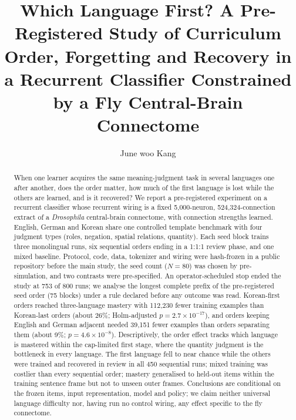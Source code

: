 \documentclass[preprint,12pt,authoryear]{elsarticle}
\begin{document}
\begin{frontmatter}

\title{Which Language First? A Pre-Registered Study of Curriculum Order, Forgetting and Recovery in a Recurrent Classifier Constrained by a Fly Central-Brain Connectome}

\author[a]{June woo Kang}
\ead{[email]}

\begin{abstract}
When one learner acquires the same meaning-judgment task in several languages one after another, does the order matter, how much of the first language is lost while the others are learned, and is it recovered? We report a pre-registered experiment on a recurrent classifier whose recurrent wiring is a fixed 5{,}000-neuron, 524{,}324-connection extract of a \emph{Drosophila} central-brain connectome, with connection strengths learned. English, German and Korean share one controlled template benchmark with four judgment types (roles, negation, spatial relations, quantity). Each seed block trains three monolingual runs, six sequential orders ending in a 1:1:1 review phase, and one mixed baseline. Protocol, code, data, tokenizer and wiring were hash-frozen in a public repository before the main study, the seed count ($N{=}80$) was chosen by pre-simulation, and two contrasts were pre-specified. An operator-scheduled stop ended the study at 753 of 800 runs; we analyse the longest complete prefix of the pre-registered seed order (75 blocks) under a rule declared before any outcome was read. Korean-first orders reached three-language mastery with 112{,}230 fewer training examples than Korean-last orders (about 26\%; Holm-adjusted $p{=}2.7{\times}10^{-17}$), and orders keeping English and German adjacent needed 39{,}151 fewer examples than orders separating them (about 9\%; $p{=}4.6{\times}10^{-8}$). Descriptively, the order effect tracks which language is mastered within the cap-limited first stage, where the quantity judgment is the bottleneck in every language. The first language fell to near chance while the others were trained and recovered in review in all 450 sequential runs; mixed training was costlier than every sequential order; mastery generalised to held-out items within the training sentence frame but not to unseen outer frames. Conclusions are conditional on the frozen items, input representation, model and policy; we claim neither universal language difficulty nor, having run no control wiring, any effect specific to the fly connectome.
\end{abstract}


\end{frontmatter}
\end{document}
